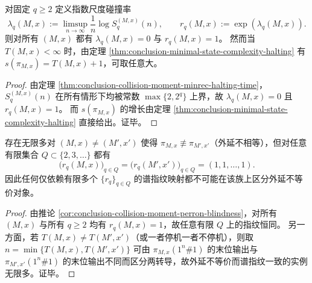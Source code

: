 \begin{corollary}[指数尺度碰撞谱指纹对停机时间不敏感]\label{cor:conclusion-collision-moment-perron-blindness}
对固定 \(q\ge 2\) 定义指数尺度碰撞率
\[
\lambda_q(M,x):=\limsup_{n\to\infty}\frac{1}{n}\log S_q^{(M,x)}(n),
\qquad
r_q(M,x):=\exp(\lambda_q(M,x)).
\]
则对所有 \((M,x)\) 都有 \(\lambda_q(M,x)=0\) 与 \(r_q(M,x)=1\)。
然而当 \(T(M,x)<\infty\) 时，由定理 \ref{thm:conclusion-minimal-state-complexity-halting} 有 \(s(\pi_{M,x})=T(M,x)+1\)，可取任意大。
\end{corollary}
\begin{proof}
由定理 \ref{thm:conclusion-collision-moment-minrec-halting-time}，\(S_q^{(M,x)}(n)\) 在所有情形下均被常数 \(\max\{2,2^q\}\) 上界，故 \(\lambda_q(M,x)=0\) 且 \(r_q(M,x)=1\)。
而 \(s(\pi_{M,x})\) 的增长由定理 \ref{thm:conclusion-minimal-state-complexity-halting} 直接给出。证毕。
\end{proof}

\begin{corollary}[有限碰撞谱指纹不可能构成完备不变量]\label{cor:conclusion-finite-collision-spectrum-incomplete}
存在无限多对 \((M,x)\neq(M',x')\) 使得 \(\pi_{M,x}\not\equiv \pi_{M',x'}\)（外延不相等），但对任意有限集合 \(Q\subset\{2,3,\dots\}\) 都有
\[
\bigl(r_q(M,x)\bigr)_{q\in Q}=\bigl(r_q(M',x')\bigr)_{q\in Q}=(1,1,\dots,1).
\]
因此任何仅依赖有限多个 \(\{r_q\}_{q\in Q}\) 的谱指纹映射都不可能在该族上区分外延不等价对象。
\end{corollary}
\begin{proof}
由推论 \ref{cor:conclusion-collision-moment-perron-blindness}，对所有 \((M,x)\) 与所有 \(q\ge 2\) 均有 \(r_q(M,x)=1\)，故任意有限 \(Q\) 上的指纹恒同。
另一方面，若 \(T(M,x)\neq T(M',x')\)（或一者停机一者不停机），则取 \(n=\min\{T(M,x),T(M',x')\}\) 可由 \(\pi_{M,x}(1^n\#1)\) 的末位输出与 \(\pi_{M',x'}(1^n\#1)\) 的末位输出不同而区分两转导，故外延不等价而谱指纹一致的实例无限多。证毕。
\end{proof}

\endinput

